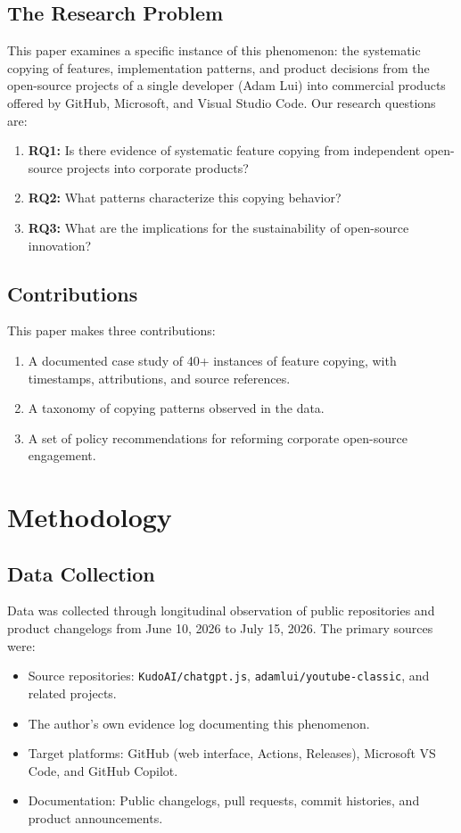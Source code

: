 \documentclass[12pt]{article}
\begin{document}
\subsection{The Research Problem}
This paper examines a specific instance of this phenomenon: the systematic copying of features, implementation patterns, and product decisions from the open-source projects of a single developer (Adam Lui) into commercial products offered by GitHub, Microsoft, and Visual Studio Code. Our research questions are:
\begin{enumerate}
\item \textbf{RQ1:} Is there evidence of systematic feature copying from independent open-source projects into corporate products?
\item \textbf{RQ2:} What patterns characterize this copying behavior?
\item \textbf{RQ3:} What are the implications for the sustainability of open-source innovation?
\end{enumerate}

\subsection{Contributions}
This paper makes three contributions:
\begin{enumerate}
\item A documented case study of 40+ instances of feature copying, with timestamps, attributions, and source references.
\item A taxonomy of copying patterns observed in the data.
\item A set of policy recommendations for reforming corporate open-source engagement.
\end{enumerate}

\section{Methodology}

\subsection{Data Collection}
Data was collected through longitudinal observation of public repositories and product changelogs from June 10, 2026 to July 15, 2026. The primary sources were:
\begin{itemize}
\item Source repositories: \texttt{KudoAI/chatgpt.js}\cite{kudoai_chatgptjs}, \texttt{adamlui/youtube-classic}, and related projects.
\item The author's own evidence log documenting this phenomenon\cite{lui_github_copylog}.
\item Target platforms: GitHub (web interface, Actions, Releases), Microsoft VS Code\cite{vscode_commits}, and GitHub Copilot.
\item Documentation: Public changelogs\cite{github_changelog}, pull requests, commit histories, and product announcements.
\end{itemize}
\end{document}
